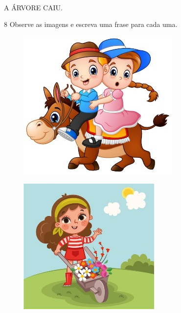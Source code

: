 \begin{mdframed}[linewidth=2pt,linecolor=salmao]
\vspace{7,5cm}
\end{mdframed}

\begin{myquote}
\centering
A ÁRVORE CAIU.
\end{myquote}

\begin{mdframed}[linewidth=2pt,linecolor=salmao]
\vspace{7,5cm}
\end{mdframed}


\pagebreak

\num{8} Observe as imagens e escreva uma frase para cada uma.
\enlargethispage{\baselineskip}


\begin{figure}[H]
\centering
\includegraphics[width=.55\textwidth]{media/image67.jpeg}
\end{figure}


\begin{figure}[H]
\centering
\includegraphics[width=.6\textwidth]{media/image68.jpeg}
\end{figure}

